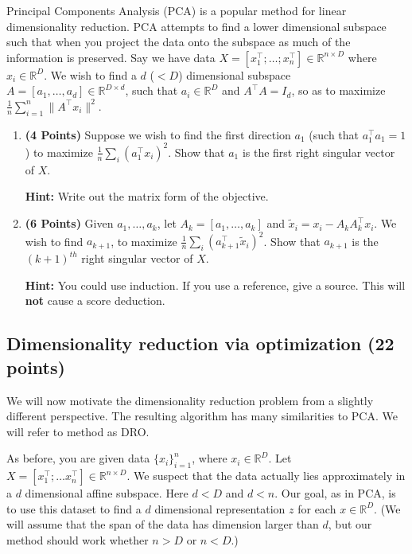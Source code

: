 \documentclass[letter]{article}
\newcounter{thm}
\theoremstyle{definition}
\newcommand{\RR}{\mathbb{R}}
\begin{document}
Principal Components Analysis (PCA) is a popular method for linear dimensionality reduction. PCA attempts to find a lower dimensional subspace such that when you project the data onto the subspace as much of the information is preserved. Say we have data $X = [x_1^\top; \dots; x_n^\top] \in \RR^{n\times D}$ where  $x_i \in \RR^D$. We wish to find a $d$ ($ < D$) dimensional subspace $A = [a_1, \dots, a_d] \in \RR^{D\times d}$, such that $ a_i \in \RR^D$ and $A^\top A = I_d$, so as to maximize $\frac{1}{n} \sum_{i=1}^n \|A^\top x_i\|^2$.
\begin{enumerate}

\item  \textbf{(4 Points)}
Suppose we wish to find the first direction $a_1$ (such that $a_1^\top a_1 = 1$) to maximize $\frac{1}{n} \sum_i (a_1^\top x_i)^2$.
Show that $a_1$ is the first right singular vector of $X$.

\textbf{Hint: }Write out the matrix form of the objective.
\item  \textbf{(6 Points)}
Given $a_1, \dots, a_k$, let $A_k = [a_1, \dots, a_k]$ and 
$\tilde{x}_i = x_i - A_kA_k^\top x_i$. We wish to find $a_{k+1}$, to maximize
$\frac{1}{n} \sum_i (a_{k+1}^\top \tilde{x}_i)^2$. Show that $a_{k+1}$ is the
$(k+1)^{th}$ right singular vector of $X$.

\textbf{Hint: }You could use induction. If you use a reference, give a source. This will \textbf{not} cause a score deduction.

\end{enumerate}


\subsection{Dimensionality reduction via optimization (22 points)}

We will now motivate the dimensionality reduction problem from a slightly different
perspective. The resulting algorithm has many similarities to PCA.
We will refer to method as DRO.

As before, you are given data $\{x_i\}_{i=1}^n$, where $x_i \in \RR^D$. Let $X=[x_1^\top; \dots
x_n^\top] \in \RR^{n\times D}$. We suspect that the data
actually lies approximately in  a $d$ dimensional affine subspace.
Here $d<D$ and $d<n$.
Our goal, as in PCA, is to use this dataset to find a $d$ dimensional representation $z$ for each $x\in\RR^D$.
(We will assume that the span of the data has dimension larger than
$d$, but our method should work whether $n>D$ or $n<D$.)
\end{document}
